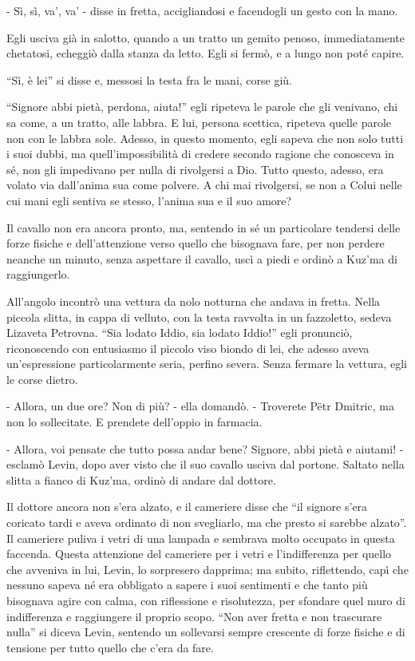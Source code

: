 - Sì, sì, va', va' - disse in fretta, accigliandosi e facendogli un gesto con la mano. 

Egli usciva già in salotto, quando a un tratto un gemito penoso, immediatamente chetatosi, echeggiò dalla stanza da letto. Egli si fermò, e a lungo non poté capire. 

``Sì, è lei'' si disse e, messosi la testa fra le mani, corse giù. 

``Signore abbi pietà, perdona, aiuta!'' egli ripeteva le parole che gli venivano, chi sa come, a un tratto, alle labbra. E lui, persona scettica, ripeteva quelle parole non con le labbra sole. Adesso, in questo momento, egli sapeva che non solo tutti i suoi dubbi, ma quell'impossibilità di credere secondo ragione che conosceva in sé, non gli impedivano per nulla di rivolgersi a Dio. Tutto questo, adesso, era volato via dall'anima sua come polvere. A chi mai rivolgersi, se non a Colui nelle cui mani egli sentiva se stesso, l'anima sua e il suo amore? 

Il cavallo non era ancora pronto, ma, sentendo in sé un particolare tendersi delle forze fisiche e dell'attenzione verso quello che bisognava fare, per non perdere neanche un minuto, senza aspettare il cavallo, uscì a piedi e ordinò a Kuz'ma di raggiungerlo. 

All'angolo incontrò una vettura da nolo notturna che andava in fretta. Nella piccola slitta, in cappa di velluto, con la testa ravvolta in un fazzoletto, sedeva Lizaveta Petrovna. ``Sia lodato Iddio, sia lodato Iddio!'' egli pronunciò, riconoscendo con entusiasmo il piccolo viso biondo di lei, che adesso aveva un'espressione particolarmente seria, perfino severa. Senza fermare la vettura, egli le corse dietro. 

- Allora, un due ore? Non di più? - ella domandò. - Troverete Pëtr Dmitric, ma non lo sollecitate. E prendete dell'oppio in farmacia. 

- Allora, voi pensate che tutto possa andar bene? Signore, abbi pietà e aiutami! - esclamò Levin, dopo aver visto che il suo cavallo usciva dal portone. Saltato nella slitta a fianco di Kuz'ma, ordinò di andare dal dottore. 

\label{xiv-6} 

Il dottore ancora non s'era alzato, e il cameriere disse che ``il signore s'era coricato tardi e aveva ordinato di non svegliarlo, ma che presto si sarebbe alzato''. Il cameriere puliva i vetri di una lampada e sembrava molto occupato in questa faccenda. Questa attenzione del cameriere per i vetri e l'indifferenza per quello che avveniva in lui, Levin, lo sorpresero dapprima; ma subito, riflettendo, capì che nessuno sapeva né era obbligato a sapere i suoi sentimenti e che tanto più bisognava agire con calma, con riflessione e risolutezza, per sfondare quel muro di indifferenza e raggiungere il proprio scopo. ``Non aver fretta e non trascurare nulla'' si diceva Levin, sentendo un sollevarsi sempre crescente di forze fisiche e di tensione per tutto quello che c'era da fare. 

